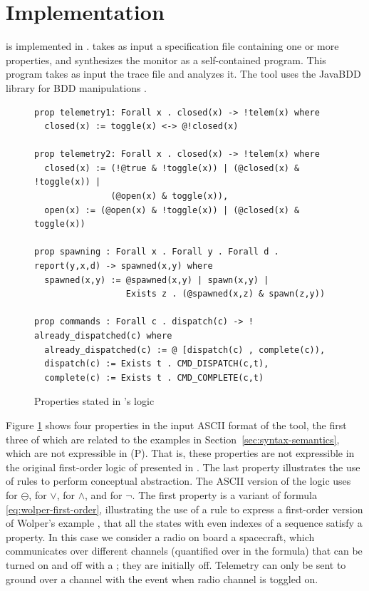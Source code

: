
\section{Implementation}
\label{implement}

\dejavu{} is implemented in \scalalang{}.   
\dejavu{} takes as input a specification file containing one  or 
more  properties, and synthesizes the monitor as a self-contained \scalalang{} 
program.
This program takes as input the 
trace file and analyzes it.
The tool uses the JavaBDD library for BDD manipulations \cite{javabdd}.

\begin{figure}
\begin{center}
\begin{lstlisting}[language=dsl,frame=single,linewidth=0.95\textwidth,backgroundcolor=\color{white},linewidth=\columnwidth,breaklines=true,basicstyle=\small]
prop telemetry1: Forall x . closed(x) -> !telem(x) where 
  closed(x) := toggle(x) <-> @!closed(x) 

prop telemetry2: Forall x . closed(x) -> !telem(x) where
  closed(x) := (!@true & !toggle(x)) | (@closed(x) & !toggle(x)) | 
               (@open(x) & toggle(x)),
  open(x) := (@open(x) & !toggle(x)) | (@closed(x) & toggle(x))

prop spawning : Forall x . Forall y . Forall d . report(y,x,d) -> spawned(x,y) where
  spawned(x,y) := @spawned(x,y) | spawn(x,y) | 
                  Exists z . (@spawned(x,z) & spawn(z,y))

prop commands : Forall c . dispatch(c) -> ! already_dispatched(c) where
  already_dispatched(c) := @ [dispatch(c) , complete(c)),
  dispatch(c) := Exists t . CMD_DISPATCH(c,t),
  complete(c) := Exists t . CMD_COMPLETE(c,t)
\end{lstlisting}
\caption{Properties stated in \dejavu's logic}
\label{fig:properties}
\end{center}
\end{figure}

\vspace{1ex}
Figure \ref{fig:properties} shows four properties in the 
input ASCII format of the tool, the first three of which are related 
to the examples in Section~\ref{sec:syntax-semantics}, which
are not expressible in (P)\FLTL{}. That is,
these properties are not expressible in the original first-order 
logic of \dejavu{} presented in \cite{HPU}. The last property illustrates the use of rules to perform conceptual abstraction.
%
The ASCII version of the logic uses 
 for $\ominus$,
\idsl{|} for $\vee$,
\idsl{&} for $\wedge$, and
\idsl{!} for $\neg$.
%
The first property  is a variant of
formula \ref{eq:wolper-first-order}, illustrating the use of a 
rule to express a first-order version of Wolper's example \cite{Wolper}, that all the states with even indexes of a sequence satisfy a property.
In this case we consider a radio on board a spacecraft, which communicates over different channels (quantified over in the formula) that can be turned on and off with a ; they are initially off.
Telemetry can only be sent to ground over a channel  with the  event when radio channel  is toggled on.

